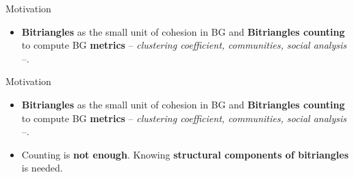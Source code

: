 \begin{frame}[fragile]{Motivation}
  \begin{itemize}
    \setlength\itemsep{1.5em}
    \item \textbf{Bitriangles} as the small unit of cohesion in BG and \textbf{Bitriangles counting} to compute BG \textbf{metrics} -- \emph{clustering coefficient, communities, social analysis} --.
  \end{itemize}
\end{frame}

\begin{frame}[fragile]{Motivation}
  \begin{itemize}
    \setlength\itemsep{1.5em}
    \item {\color{light}\textbf{Bitriangles} as the small unit of cohesion in BG and \textbf{Bitriangles counting} to compute BG \textbf{metrics} -- \emph{clustering coefficient, communities, social analysis} --.}
    \item Counting is \textbf{not enough}. Knowing \textbf{structural components of bitriangles} is needed. 
  \end{itemize}
\end{frame}

